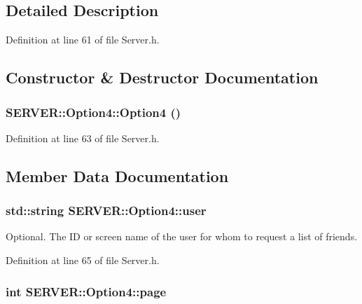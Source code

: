 \subsection{Detailed Description}


Definition at line 61 of file Server.h.

\subsection{Constructor \& Destructor Documentation}
\hypertarget{structSERVER_1_1Option4_b641f3c3122d862af9d365ff219f7219}{
\subsubsection{\setlength{\rightskip}{0pt plus 5cm}SERVER::Option4::Option4 ()}}
\label{structSERVER_1_1Option4_b641f3c3122d862af9d365ff219f7219}




Definition at line 63 of file Server.h.

\subsection{Member Data Documentation}
\hypertarget{structSERVER_1_1Option4_3ba9825ad8182388e55c978bf9b1867f}{
\subsubsection{\setlength{\rightskip}{0pt plus 5cm}std::string {\bf SERVER::Option4::user}}}
\label{structSERVER_1_1Option4_3ba9825ad8182388e55c978bf9b1867f}


Optional. The ID or screen name of the user for whom to request a list of friends. 



Definition at line 65 of file Server.h.\hypertarget{structSERVER_1_1Option4_f93ca2adc6bbaef592b92364c492a97d}{
\subsubsection{\setlength{\rightskip}{0pt plus 5cm}int {\bf SERVER::Option4::page}}}
\label{structSERVER_1_1Option4_f93ca2adc6bbaef592b92364c492a97d}


